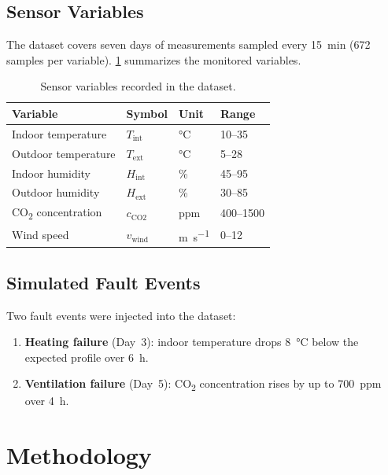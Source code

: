 \documentclass[preprint,12pt,authoryear]{elsarticle}
\begin{document}
\subsection{Sensor Variables}

The dataset covers seven days of measurements sampled every
\SI{15}{\minute} (\num{672} samples per variable).
\cref{tab:variables} summarizes the monitored variables.

\begin{table}[ht]
\centering
\caption{Sensor variables recorded in the dataset.}
\label{tab:variables}
\begin{tabular}{llll}
\toprule
Variable & Symbol & Unit & Range \\
\midrule
Indoor temperature  & $T_\text{int}$ & \si{\celsius}   & 10–35 \\
Outdoor temperature & $T_\text{ext}$ & \si{\celsius}   & 5–28  \\
Indoor humidity     & $H_\text{int}$ & \si{\percent}   & 45–95 \\
Outdoor humidity    & $H_\text{ext}$ & \si{\percent}   & 30–85 \\
CO\textsubscript{2} concentration & $c_\text{CO2}$ & ppm & 400–1500 \\
Wind speed          & $v_\text{wind}$& \si{\metre\per\second} & 0–12 \\
\bottomrule
\end{tabular}
\end{table}

\subsection{Simulated Fault Events}

Two fault events were injected into the dataset:
\begin{enumerate}
  \item \textbf{Heating failure} (Day~3): indoor temperature drops
        \SI{8}{\celsius} below the expected profile over \SI{6}{\hour}.
  \item \textbf{Ventilation failure} (Day~5): CO\textsubscript{2}
        concentration rises by up to \SI{700}{ppm} over \SI{4}{\hour}.
\end{enumerate}

\section{Methodology}
\label{sec:methods}
\end{document}

